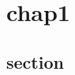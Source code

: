\documentclass[10pt,a4j,openany,dvipdfmx]{jsbook}
\begin{document}
\chapter{chap1} %
\label{cha:chap1}


\section{section} %
\label{sec:section}




\end{document}

